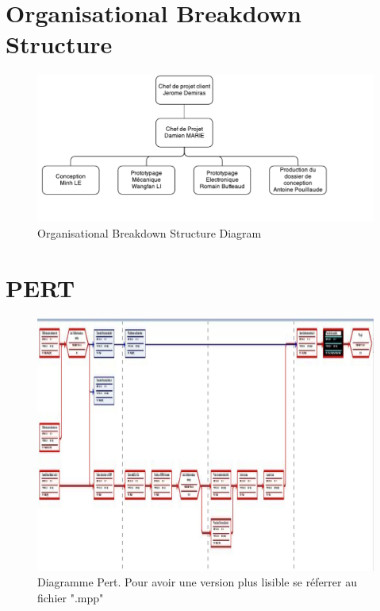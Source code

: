 \documentclass[a4paper, 12pt, leqno]{report}
\theoremstyle{plain}
\begin{document}
\begin{landscape}
        \section{Organisational Breakdown Structure}
        \begin{figure}[H]
           \begin{center}
           \includegraphics[scale=1.5]{Files/OBSProject_review_v2.pdf}
           \end{center}
           \caption{Organisational Breakdown Structure Diagram}
           \label{Organisational Breakdown Structure Diagram}
           \end{figure}
           \section{PERT}
           \begin{figure}[H]
           \begin{center}
           \includegraphics[scale=0.75]{Files/Pert.pdf}
           \end{center}
           \caption{Diagramme Pert. Pour avoir une version plus lisible se réferrer au fichier ".mpp"}
           \label{Diagramme Pert.}
           \end{figure}

\end{landscape}
\end{document}
